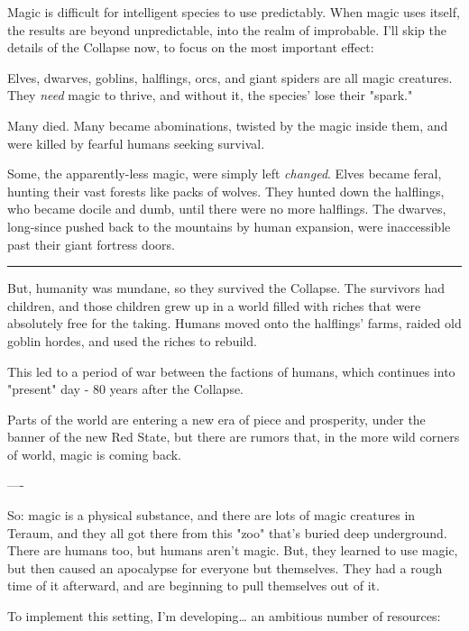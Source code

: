 \documentclass[11pt]{article}
\begin{document}
Magic is difficult for intelligent species to use predictably. When
magic uses itself, the results are beyond unpredictable, into the
realm of improbable. I'll skip the details of the Collapse now, to
focus on the most important effect:

Elves, dwarves, goblins, halflings, orcs, and giant spiders are all
magic creatures. They \emph{need} magic to thrive, and without it, the
species' lose their "spark."

Many died. Many became abominations, twisted by the magic inside them,
and were killed by fearful humans seeking survival.

Some, the apparently-less magic, were simply left \emph{changed}. Elves
became feral, hunting their vast forests like packs of wolves. They
hunted down the halflings, who became docile and dumb, until there
were no more halflings. The dwarves, long-since pushed back to the
mountains by human expansion, were inaccessible past their giant
fortress doors.

\noindent\rule{\textwidth}{0.5pt}

But, humanity was mundane, so they survived the Collapse. The
survivors had children, and those children grew up in a world filled
with riches that were absolutely free for the taking. Humans moved
onto the halflings' farms, raided old goblin hordes, and used the
riches to rebuild.

This led to a period of war between the factions of humans, which
continues into "present" day - 80 years after the Collapse.

Parts of the world are entering a new era of piece and prosperity,
under the banner of the new Red State, but there are rumors that, in
the more wild corners of world, magic is coming back.

----

So: magic is a physical substance, and there are lots of magic
creatures in Teraum, and they all got there from this "zoo" that's
buried deep underground. There are humans too, but humans aren't
magic. But, they learned to use magic, but then caused an apocalypse
for everyone but themselves. They had a rough time of it afterward,
and are beginning to pull themselves out of it.

To implement this setting, I'm developing\ldots{} an ambitious number of
resources:
\end{document}
